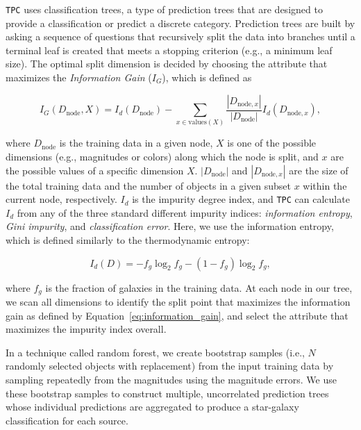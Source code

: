 \documentclass[useAMS,usenatbib]{mn2e}
\newcommand{\eg}{{e.g., }}
\newcommand{\ie}{{i.e., }}
\begin{document}
\texttt{TPC} uses classification trees,
a type of prediction trees that are designed to
provide a classification or predict a discrete category.
Prediction trees are built by asking a sequence of questions
that recursively split the data into branches
until a terminal leaf is created
that meets a stopping criterion
(\eg a minimum leaf size).
The optimal split dimension is decided by
choosing the attribute that maximizes
the \textit{Information Gain} ($I_G$), which is defined as

\begin{equation}
  I_G \left(D_{\mathrm{node}}, X\right)
  = I_d \left( D_{\mathrm{node}} \right)
  - \sum_{x \in \mathrm{values}(X)}
  \frac{|D_{\mathrm{node}, x}|}{|D_{\mathrm{node}}|}
  I_d \left( D_{\mathrm{node}, x} \right),
  \label{eq:information_gain}
\end{equation}

\noindent
where $D_{\mathrm{node}}$ is the training data in a given node,
$X$ is one of the possible dimensions (\eg magnitudes or colors)
along which the node is split, and
$x$ are the possible values of a specific dimension $X$.
$|D_{\mathrm{node}}|$ and $|D_{\mathrm{node}, x}|$ are the size of the total training data
and the number of objects in a given subset $x$ within the current node,
respectively.
$I_d$ is the impurity degree index,
and \texttt{TPC} can calculate $I_d$
from any of the three standard different impurity indices:
\textit{information entropy}, \textit{Gini impurity},
and \textit{classification error}.
Here, we use the information entropy,
which is defined similarly to the thermodynamic entropy:

\begin{equation}
  I_d \left( D \right)
  = - f_g \log_{2} f_g - (1 - f_g) \log_{2} f_g,
\end{equation}

\noindent
where $f_g$ is the fraction of galaxies in the training data.
At each node in our tree,
we scan all dimensions to identify the split point that
maximizes the information gain as defined by Equation~\ref{eq:information_gain},
and select the attribute that maximizes the impurity index overall.

In a technique called random forest,
we create bootstrap samples
(\ie $N$ randomly selected objects with replacement)
from the input training data
by sampling repeatedly from the magnitudes using the magnitude errors.
We use these bootstrap samples to construct
multiple, uncorrelated prediction trees
whose individual predictions are aggregated to produce
a star-galaxy classification for each source.
\end{document}

